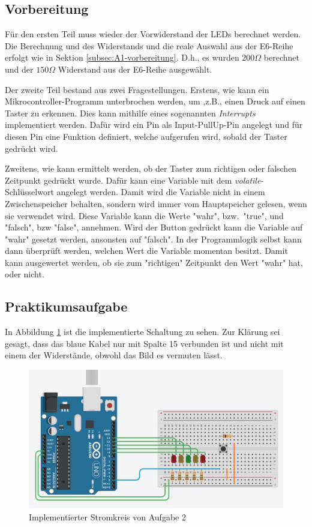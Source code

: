 \subsection{Vorbereitung}
\label{subsec:a2-vorbereitung}

Für den ersten Teil muss wieder der Vorwiderstand der LEDs berechnet werden.
Die Berechnung und des Widerstands und die reale Auswahl aus der E6-Reihe erfolgt wie in Sektion \ref{subsec:A1-vorbereitung}.
D.h., es wurden $200\Omega$ berechnet und der $150\Omega$ Widerstand aus der E6-Reihe ausgewählt.

Der zweite Teil bestand aus zwei Fragestellungen.
Erstens, wie kann ein Mikrocontroller-Programm unterbrochen werden, um ,z.B., einen Druck auf einen Taster zu erkennen.
Dies kann mithilfe eines sogenannten \textit{Interrupts} implementiert werden.
Dafür wird ein Pin als Input-PullUp-Pin angelegt und für diesen Pin eine Funktion definiert, welche aufgerufen wird, sobald der Taster gedrückt wird.

Zweitens, wie kann ermittelt werden, ob der Taster zum richtigen oder falschen Zeitpunkt gedrückt wurde.
Dafür kann eine Variable mit dem \textit{volatile}-Schlüsselwort angelegt werden.
Damit wird die Variable nicht in einem Zwischenspeicher behalten, sondern wird immer vom Hauptspeicher gelesen, wenn sie verwendet wird.
Diese Variable kann die Werte "wahr", bzw.\ "true", und "falsch", bzw "false", annehmen.
Wird der Button gedrückt kann die Variable auf "wahr" gesetzt werden, ansonsten auf "falsch".
In der Programmlogik selbst kann dann überprüft werden, welchen Wert die Variable momentan besitzt.
Damit kann ausgewertet werden, ob sie zum "richtigen" Zeitpunkt den Wert "wahr" hat, oder nicht.

\subsection{Praktikumsaufgabe}
\label{subsec:a2-praktikumsaufgabe2}

In Abbildung \ref{fig:implementierter-stromkreis-a2} ist die implementierte Schaltung zu sehen.
Zur Klärung sei gesagt, dass das blaue Kabel nur mit Spalte 15 verbunden ist und nicht mit einem der Widerstände, obwohl das Bild es vermuten lässt.

\begin{figure}[ht]
    \centering
    \includegraphics[width=\textwidth]{pictures/a2-praktik.png}
    \caption{Implementierter Stromkreis von Aufgabe 2}
    \label{fig:implementierter-stromkreis-a2}
\end{figure}

